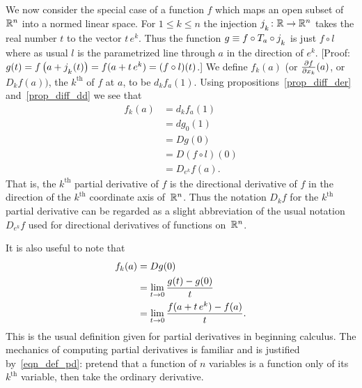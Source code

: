 \begin{defn}  We now consider the special case of a function $f$ which maps an open subset of
$\mathbb{R}^n$ into a normed linear space. For $1 \le k \le n$ the injection $j_{{}_{{\scriptstyle{k}}}}\colon \mathbb{R}
\rightarrow \mathbb{R}^n$ takes the real number $t$ to the vector $t\,e^k$.  Thus the function $g \equiv f
\circ T_a \circ j_{{}_{{\scriptstyle{k}}}}$ is just $f \circ l$ where as usual $l$ is the parametrized
line through $a$ in the direction of $e^k$.  [Proof: $g(t) = f\left(a + j_{{}_{{\scriptstyle{k}}}}(t)\right) = f(a + t\,e^k) = (f \circ l)(t)$.]  We define
$f_k(a)$ (or $\frac{\partial f}{\partial x_k}(a)$, or $D_kf(a))$, the $k^{\text {th}}$
 of $f$ at $a$, to be $d_kf_a(1)$.  Using
propositions~\ref{prop_diff_der} and~\ref{prop_diff_dd} we see that
  \begin{align*}
            f_k(a) &= d_kf_a(1)        \\
                   &= dg_0(1)          \\
                   &= Dg(0)            \\
                   &= D(f \circ l)(0)  \\
                   &= D_{e^k}f(a).
  \end{align*}
That is, the $k^{\text {th}}$ partial derivative of $f$ is the directional derivative of $f$
in the direction of the $k^{\text {th}}$ coordinate axis of~$\mathbb{R}^n$.  Thus the notation $D_kf$
for the $k^{\text {th}}$ partial derivative can be regarded as a slight abbreviation of the
usual notation $D_{e^k}f$ used for directional derivatives of functions on~$\mathbb{R}^n$.
\end{defn}

It is also useful to note that
 \begin{equation}\label{eqn_def_pd}
   \begin{aligned}
        f_k(a) &= Dg(0)        \\
               &= \lim_{t \rightarrow 0} \frac {g(t) - g(0)}t  \\
               &= \lim_{t \rightarrow 0} \frac {f(a + t\,e^k) - f(a)}t.
   \end{aligned}
 \end{equation}
This is the usual definition given for partial derivatives in beginning calculus.  The
mechanics of computing partial derivatives is familiar and is justified by~\eqref{eqn_def_pd}:
pretend that a function of $n$ variables is a function only of its $k^{\text {th}}$ variable,
then take the ordinary derivative.

